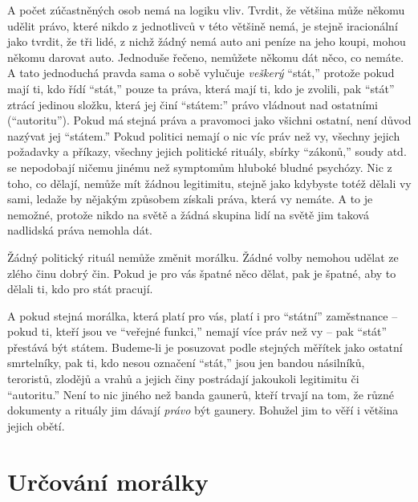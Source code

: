 \documentclass{book}
\begin{document}
A počet zúčastněných osob nemá na logiku vliv. Tvrdit, že většina může někomu udělit právo, které nikdo z jednotlivců v této většině nemá, je stejně iracionální jako tvrdit, že tři lidé, z nichž žádný nemá auto ani peníze na jeho koupi, mohou někomu darovat auto. Jednoduše řečeno, nemůžete někomu dát něco, co nemáte. A tato jednoduchá pravda sama o sobě vylučuje \emph{veškerý} \enquote{stát,} protože pokud mají ti, kdo řídí \enquote{stát,} pouze ta práva, která mají ti, kdo je zvolili, pak \enquote{stát} ztrácí jedinou složku, která jej činí \enquote{státem:} právo vládnout nad ostatními (\enquote{autoritu}). Pokud má stejná práva a pravomoci jako všichni ostatní, není důvod nazývat jej \enquote{státem.} Pokud politici nemají o nic víc práv než vy, všechny jejich požadavky a příkazy, všechny jejich politické rituály, sbírky \enquote{zákonů,} soudy atd. se nepodobají ničemu jinému než symptomům hluboké bludné psychózy. Nic z toho, co dělají, nemůže mít žádnou legitimitu, stejně jako kdybyste totéž dělali vy sami, ledaže by nějakým způsobem získali práva, která vy nemáte. A to je nemožné, protože nikdo na světě a žádná skupina lidí na světě jim taková nadlidská práva nemohla dát.

Žádný politický rituál nemůže změnit morálku. Žádné volby nemohou udělat ze zlého činu dobrý čin. Pokud je pro vás špatné něco dělat, pak je špatné, aby to dělali ti, kdo pro stát pracují.

A pokud stejná morálka, která platí pro vás, platí i pro \enquote{státní} zaměstnance -- pokud ti, kteří jsou ve \enquote{veřejné funkci,} nemají více práv než vy -- pak \enquote{stát} přestává být státem. Budeme-li je posuzovat podle stejných měřítek jako ostatní smrtelníky, pak ti, kdo nesou označení \enquote{stát,} jsou jen bandou násilníků, teroristů, zlodějů a vrahů a jejich činy postrádají jakoukoli legitimitu či \enquote{autoritu.} Není to nic jiného než banda gaunerů, kteří trvají na tom, že různé dokumenty a rituály jim dávají \emph{právo} být gaunery. Bohužel jim to věří i většina jejich obětí.

\section{Určování morálky}
\end{document}
